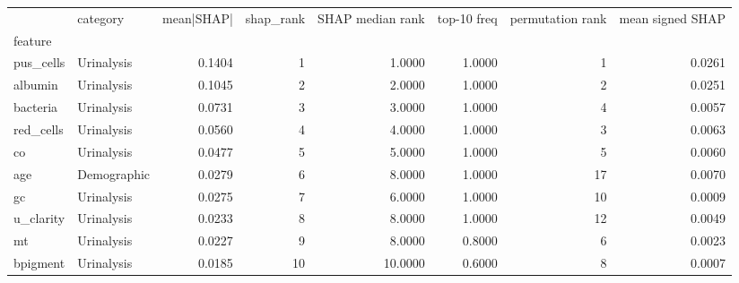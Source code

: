\begin{tabular}{llrrrrrr}
\toprule
 & category & mean|SHAP| & shap_rank & SHAP median rank & top-10 freq & permutation rank & mean signed SHAP \\
feature &  &  &  &  &  &  &  \\
\midrule
pus_cells & Urinalysis & 0.1404 & 1 & 1.0000 & 1.0000 & 1 & 0.0261 \\
albumin & Urinalysis & 0.1045 & 2 & 2.0000 & 1.0000 & 2 & 0.0251 \\
bacteria & Urinalysis & 0.0731 & 3 & 3.0000 & 1.0000 & 4 & 0.0057 \\
red_cells & Urinalysis & 0.0560 & 4 & 4.0000 & 1.0000 & 3 & 0.0063 \\
co & Urinalysis & 0.0477 & 5 & 5.0000 & 1.0000 & 5 & 0.0060 \\
age & Demographic & 0.0279 & 6 & 8.0000 & 1.0000 & 17 & 0.0070 \\
gc & Urinalysis & 0.0275 & 7 & 6.0000 & 1.0000 & 10 & 0.0009 \\
u_clarity & Urinalysis & 0.0233 & 8 & 8.0000 & 1.0000 & 12 & 0.0049 \\
mt & Urinalysis & 0.0227 & 9 & 8.0000 & 0.8000 & 6 & 0.0023 \\
bpigment & Urinalysis & 0.0185 & 10 & 10.0000 & 0.6000 & 8 & 0.0007 \\
\bottomrule
\end{tabular}
